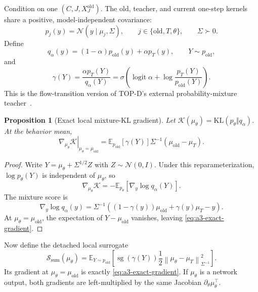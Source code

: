 \documentclass[11pt,a4paper]{article}
\newcommand{\E}{\mathbb{E}}
\newcommand{\N}{\mathcal{N}}
\newcommand{\KL}{\mathrm{KL}}
\newcommand{\norm}[1]{\left\lVert #1 \right\rVert}
\newcommand{\sg}{\operatorname{sg}}
\DeclareMathOperator{\logit}{logit}
\theoremstyle{plain}
\newtheorem{proposition}[theorem]{Proposition}
\theoremstyle{definition}
\begin{document}
Condition on one $(C,J,X_J^{\mathrm{old}})$.  The old, teacher, and current one-step kernels share
a positive, model-independent covariance:
\begin{equation}
p_j(y)=\N(y\mid\mu_j,\Sigma),
\qquad
j\in\{\mathrm{old},T,\theta\},
\qquad
\Sigma\succ0.
\label{eq:a3-kernels}
\end{equation}
Define
\begin{equation}
q_\alpha(y)
=(1-\alpha)p_{\mathrm{old}}(y)+\alpha p_T(y),
\qquad
Y\sim p_{\mathrm{old}},
\label{eq:a3-mixture}
\end{equation}
and
\begin{equation}
\gamma(Y)
=
\frac{\alpha p_T(Y)}{q_\alpha(Y)}
=
\sigma\!\left(
  \logit\alpha
  +\log\frac{p_T(Y)}{p_{\mathrm{old}}(Y)}
\right).
\label{eq:a3-responsibility}
\end{equation}
This is the flow-transition version of TOP-D's external probability-mixture
teacher~\cite{topd}.

\begin{proposition}[Exact local mixture-KL gradient]
\label{prop:a3-exact-gradient}
Let
$\mathcal K(\mu_\theta)=\KL(p_\theta\Vert q_\alpha)$.  At the behavior mean,
\begin{equation}
\left.
\nabla_{\mu_\theta}\mathcal K
\right|_{\mu_\theta=\mu_{\mathrm{old}}}
=
\E_{p_{\mathrm{old}}}[\gamma(Y)]
\Sigma^{-1}(\mu_{\mathrm{old}}-\mu_T).
\label{eq:a3-exact-gradient}
\end{equation}
\end{proposition}

\begin{proof}
Write $Y=\mu_\theta+\Sigma^{1/2}Z$ with $Z\sim\N(0,I)$.  Under this
reparameterization, $\log p_\theta(Y)$ is independent of $\mu_\theta$, so
\[
\nabla_{\mu_\theta}\mathcal K
=-\E_{p_\theta}[\nabla_y\log q_\alpha(Y)].
\]
The mixture score is
\[
\nabla_y\log q_\alpha(y)
=
\Sigma^{-1}\!\left(
  (1-\gamma(y))\mu_{\mathrm{old}}
  +\gamma(y)\mu_T-y
\right).
\]
At $\mu_\theta=\mu_{\mathrm{old}}$, the expectation of
$Y-\mu_{\mathrm{old}}$ vanishes, leaving \eqref{eq:a3-exact-gradient}.
\end{proof}

Now define the detached local surrogate
\begin{equation}
\mathcal S_{\mathrm{sum}}(\mu_\theta)
=
\E_{Y\sim p_{\mathrm{old}}}\!\left[
  \sg(\gamma(Y))
  \frac12
  \norm{\mu_\theta-\mu_T}_{\Sigma^{-1}}^2
\right].
\label{eq:a3-local-surrogate}
\end{equation}
Its gradient at $\mu_\theta=\mu_{\mathrm{old}}$ is exactly
\eqref{eq:a3-exact-gradient}.  If $\mu_\theta$ is a network output, both gradients are
left-multiplied by the same Jacobian $\partial_\theta\mu_\theta^\top$.
\end{document}
